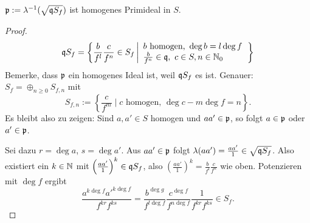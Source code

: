 \begin{hilfslemma}
	$\mathfrak{p} := \lambda^{-1}(\sqrt{\mathfrak{q} S_f})$ ist homogenes Primideal in $S$.
\end{hilfslemma}
\begin{proof}
	\[
		\mathfrak{q} S_f = \left\{ \frac{b}{f^l} \frac{c}{f^n} \in S_f \left|
			\begin{array}{l}
				b\text{ homogen, } \deg b = l\deg f\\
				\frac{b}{f^n} \in \mathfrak{q},\ c\in S,n\in \mathbb{N}_0
			\end{array}\right. \right\}
	\]
	Bemerke, dass $\mathfrak{p}$ ein homogenes Ideal ist, weil $\mathfrak{q} S_f$ es ist.
	Genauer:
	$S_f = \oplus_{n\geq 0} S_{f,n}$ mit
	\[
		S_{f,n} := \left\{\frac{c}{f^m} \mid c\text{ homogen, }
			\deg c - m\deg f = n\right\}.
	\]
	Es bleibt also zu zeigen: Sind $a,a' \in S$ homogen und 
	$aa' \in \mathfrak{p}$, so folgt $a\in \mathfrak{p}$ oder $a'\in \mathfrak{p}$.
	
	Sei dazu  $r = \deg a$, $s = \deg a'$.
	Aus $aa'\in \mathfrak{p}$ folgt $\lambda(aa') = \frac{aa'}{1} \in \sqrt{\mathfrak{q} S_f}$.
	Also existiert ein $k\in \mathbb{N}$ mit
	$\left(\frac{aa'}{1}\right)^k \in \mathfrak{q} S_f$, also
	$\left( \frac{aa'}{1}\right)^k = \frac{b}{f^l} \frac{c}{f^n}$
	wie oben. Potenzieren mit $\deg f$ ergibt
	\[
		\frac{a^{k\deg f} a'^{k\deg f}}{f^{kr} f^{ks}} = 
		\frac{b^{\deg g}}{f^{l\deg f}} \frac{c^{\deg f}}{f^{n\deg f}}
		\frac{1}{f^{kr} f^{ks}} \in S_f.
	\]
\end{proof}


